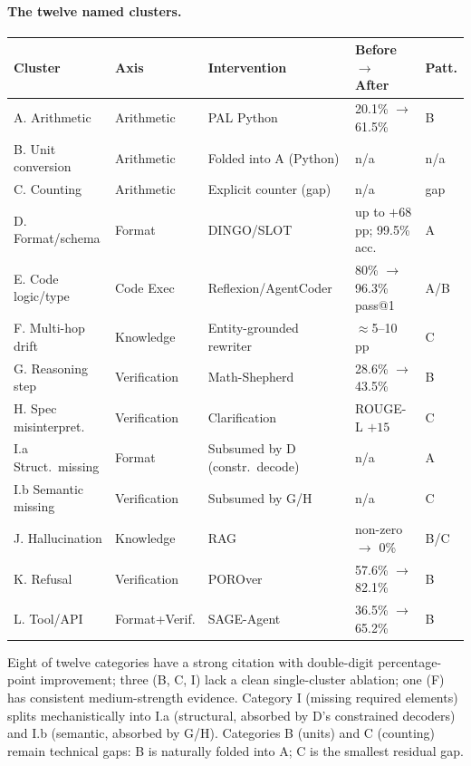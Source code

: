 \documentclass{article}
\theoremstyle{taeplain}
\theoremstyle{taedefn}
\newcommand{\teArrow}{\ensuremath{\rightarrow}}
\newcommand{\teApprox}{\ensuremath{\approx}}
\begin{document}
\paragraph{The twelve named clusters.}
\begin{center}
\small
\begin{tabular}{p{2.5cm}p{2.2cm}p{4cm}p{2.5cm}p{1cm}}
\toprule
\textbf{Cluster} & \textbf{Axis} & \textbf{Intervention} & \textbf{Before $\teArrow$ After} & \textbf{Patt.}\\
\midrule
A. Arithmetic & Arithmetic & PAL Python~\citep{gao2022pal} & 20.1\% $\teArrow$ 61.5\% & B\\
B. Unit conversion & Arithmetic & Folded into A (Python) & n/a & n/a\\
C. Counting & Arithmetic & Explicit counter (gap) & n/a & gap\\
D. Format/schema & Format & DINGO/SLOT~\citep{suresh2025dingo,wang2025slot} & up to $+68$ pp; 99.5\% acc. & A\\
E. Code logic/type & Code Exec & Reflexion/AgentCoder~\citep{shinn2023reflexion,huang2023agentcoder} & 80\% $\teArrow$ 96.3\% pass@1 & A/B\\
F. Multi-hop drift & Knowledge & Entity-grounded rewriter & $\teApprox$5--10 pp & C\\
G. Reasoning step & Verification & Math-Shepherd~\citep{wangp2024mathshepherd} & 28.6\% $\teArrow$ 43.5\% & B\\
H. Spec misinterpret. & Verification & Clarification~\citep{niwa2024ambignlg} & ROUGE-L $+15$ & C\\
I.a Struct.\ missing & Format & Subsumed by D (constr.\ decode) & n/a & A\\
I.b Semantic missing & Verification & Subsumed by G/H & n/a & C\\
J. Hallucination & Knowledge & RAG~\citep{wood2024acurai} & non-zero $\teArrow$ 0\% & B/C\\
K. Refusal & Verification & POROver~\citep{karaman2024porover} & 57.6\% $\teArrow$ 82.1\% & B\\
L. Tool/API & Format+Verif. & SAGE-Agent~\citep{suri2025clarification} & 36.5\% $\teArrow$ 65.2\% & B\\
\bottomrule
\end{tabular}
\end{center}

Eight of twelve categories have a strong citation with double-digit percentage-point improvement; three (B, C, I) lack a clean single-cluster ablation; one (F) has consistent medium-strength evidence. Category I (missing required elements) splits mechanistically into I.a (structural, absorbed by D's constrained decoders) and I.b (semantic, absorbed by G/H). Categories B (units) and C (counting) remain technical gaps: B is naturally folded into A; C is the smallest residual gap.
\end{document}
